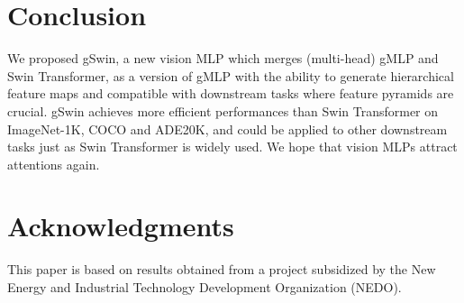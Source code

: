 \documentclass{article}
\begin{document}
\section{Conclusion}\label{label:022}

We proposed gSwin, a new vision MLP which merges (multi-head) gMLP and Swin Transformer, as a version of gMLP with the ability to generate hierarchical feature maps and compatible with downstream tasks where feature pyramids are crucial.
gSwin achieves more efficient performances than Swin Transformer on ImageNet-1K, COCO and ADE20K, and could be applied to other downstream tasks just as Swin Transformer is widely used.
We hope that vision MLPs attract attentions again.

\section*{Acknowledgments}
This paper is based on results obtained from a project subsidized by the New Energy and Industrial Technology Development Organization (NEDO).



\end{document}

